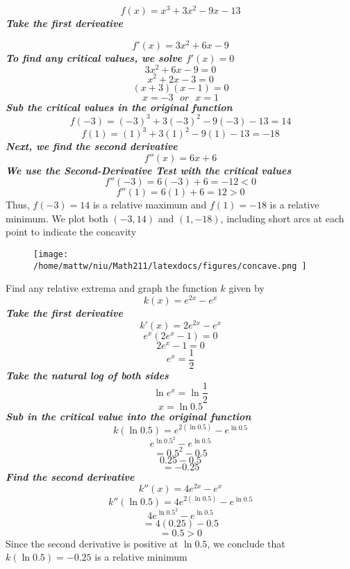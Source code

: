 \documentclass{report}
\begin{document}
$$ f(x) = x^3 + 3x^2 - 9x -13$$
\textit{\textbf{Take the first derivative}}

$$f'(x) = 3x^2 + 6x - 9$$
\bigbreak 
\noindent\textit{\textbf{To find any critical values, we solve $f'(x) = 0$}}
$$ 3x^2 + 6x-9= 0$$
$$ x^2 +2x-3=0$$
$$ (x+3)(x-1) = 0$$
$$ x = -3 \ \ \ or \ \ \ x = 1$$
\textit{\textbf{Sub the critical values in the original function}}
$$ f(-3) = (-3)^3 + 3(-3)^2 - 9(-3) -13 = 14$$
$$ f(1) = (1)^3 + 3(1)^2 - 9(1) -13 = -18$$
\textit{\textbf{Next, we find the second derivative}}
$$ f''(x) = 6x+6$$
\textit{\textbf{We use the Second-Derivative Test with the critical values}}
$$ f''(-3) = 6(-3) + 6 =-12 < 0$$
$$f''(1) = 6(1) + 6 =12 > 0$$
\bigbreak \noindent
Thus, $f(-3) = 14$ is a relative maximum and $f(1) = - 18$ is a relative minimum.
\bigbreak \noindent
We plot both $(-3,14)$ and $(1,-18)$, including short arcs at each point to indicate the concavity
\pagebreak
\begin{figure}[ht]
\centering
\texttt{[image:  /home/mattw/niu/Math211/latexdocs/figures/concave.png ]}
\end{figure}
\q 
Find any relative extrema and graph the function $k$ given by
$$ k(x) = e^{2x} -e^x$$
\textit{\textbf{Take the first derivative}}
$$ k'(x) = 2e^{2x} - e^x$$
$$ e^x(2e^x - 1) = 0$$
$$ 2e^x - 1 = 0$$
$$ e^x  = \dfrac{1}{2}$$
\textit{\textbf{Take the natural log of both sides}}
$$ \ln{e^x} = \ln{\dfrac{1}{2}}$$
$$ x = \ln{0.5}$$
\textit{\textbf{Sub in the critical value into the original function}}
$$ k(\ln{0.5}) = e^{2(\ln{0.5})} - e^{\ln{0.5}}$$
$$ e^{\ln{0.5}^2} - e^{\ln{0.5}}$$
$$ = 0.5^2 - 0.5$$
$$ 0.25 - 0.5$$
$$ = -0.25$$
\textit{\textbf{Find the second derivative}}
$$ k''(x) = 4e^{2x} - e^x$$
$$ k''(\ln{0.5}) = 4e^{2(\ln0.5)} - e^{\ln0.5}$$
$$ 4e^{\ln0.5^2} - e^{\ln0.5}$$
$$ = 4(0.25) - 0.5$$
$$ = 0.5 > 0$$
Since the second derivative is positive at $\ln{0.5}$, we conclude that $k(\ln0.5) = -0.25$ is a relative minimum

\pagebreak
\begin{center}
\end{center}
\bigbreak \noindent
\end{document}

